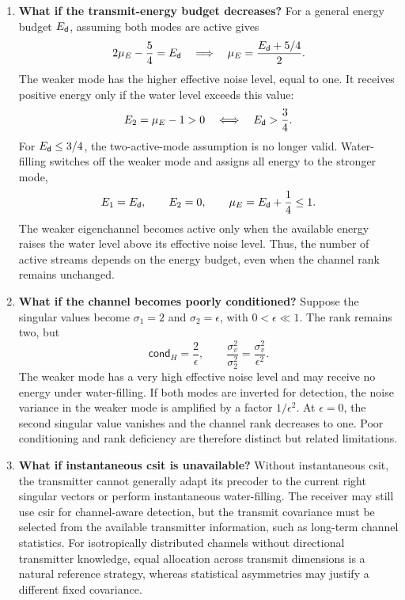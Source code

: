 \begin{enumerate}[label=\textbf{\arabic*.}]
	\item \textbf{What if the transmit-energy budget decreases?}
	For a general energy budget $E_{\mathsf{d}}$, assuming both modes are active gives
	\begin{equation*}
		2\mu_E-\frac54=E_{\mathsf{d}}
		\quad\Longrightarrow\quad
		\mu_E=\frac{E_{\mathsf{d}}+5/4}{2}.
	\end{equation*}
	The weaker mode has the higher effective noise level, equal to one. It receives positive energy only if the water level exceeds this value:
	\begin{equation*}
		E_2=\mu_E-1>0
		\quad\Longleftrightarrow\quad
		E_{\mathsf{d}}>\frac34.
	\end{equation*}
	For $E_{\mathsf{d}}\leq3/4$, the two-active-mode assumption is no longer valid. Water-filling switches off the weaker mode and assigns all energy to the stronger mode,
	\begin{equation*}
		E_1=E_{\mathsf{d}},\qquad E_2=0,\qquad
		\mu_E=E_{\mathsf{d}}+\frac14\leq1.
	\end{equation*}
	The weaker eigenchannel becomes active only when the available energy raises the water level above its effective noise level. Thus, the number of active streams depends on the energy budget, even when the channel rank remains unchanged.
	
	\item \textbf{What if the channel becomes poorly conditioned?}
	Suppose the singular values become $\sigma_1=2$ and $\sigma_2=\epsilon$, with $0<\epsilon\ll1$. The rank remains two, but
	\begin{equation*}
		\mathsf{cond}_H=\frac2{\epsilon},
		\qquad
		\frac{\sigma_v^2}{\sigma_2^2}
		=\frac{\sigma_v^2}{\epsilon^2}.
	\end{equation*}
	The weaker mode has a very high effective noise level and may receive no energy under water-filling. If both modes are inverted for detection, the noise variance in the weaker mode is amplified by a factor $1/\epsilon^2$. At $\epsilon=0$, the second singular value vanishes and the channel rank decreases to one. Poor conditioning and rank deficiency are therefore distinct but related limitations.
	
	\item \textbf{What if instantaneous \ac{csit} is unavailable?}
	Without instantaneous \ac{csit}, the transmitter cannot generally adapt its precoder to the current right singular vectors or perform instantaneous water-filling. The receiver may still use \ac{csir} for channel-aware detection, but the transmit covariance must be selected from the available transmitter information, such as long-term channel statistics. For isotropically distributed channels without directional transmitter knowledge, equal allocation across transmit dimensions is a natural reference strategy, whereas statistical asymmetries may justify a different fixed covariance.
	

\end{enumerate}
